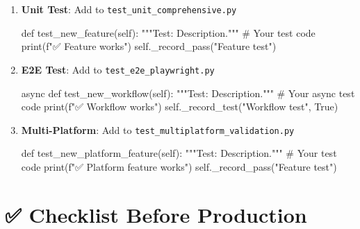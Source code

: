 \documentclass[
  11pt,
  oneside,
  openany]{scrbook}
\newenvironment{Shaded}{\begin{snugshade}}{\end{snugshade}}
\newcommand{\BuiltInTok}[1]{\textcolor[rgb]{0.00,0.23,0.31}{#1}}
\newcommand{\CommentTok}[1]{\textcolor[rgb]{0.37,0.37,0.37}{#1}}
\newcommand{\ControlFlowTok}[1]{\textcolor[rgb]{0.00,0.23,0.31}{#1}}
\newcommand{\KeywordTok}[1]{\textcolor[rgb]{0.00,0.23,0.31}{#1}}
\newcommand{\NormalTok}[1]{\textcolor[rgb]{0.00,0.23,0.31}{#1}}
\newcommand{\SpecialStringTok}[1]{\textcolor[rgb]{0.13,0.47,0.30}{#1}}
\newcommand{\StringTok}[1]{\textcolor[rgb]{0.13,0.47,0.30}{#1}}
\newcommand{\VariableTok}[1]{\textcolor[rgb]{0.07,0.07,0.07}{#1}}
\begin{document}
\begin{enumerate}
\def\labelenumi{\arabic{enumi}.}
\item
  \textbf{Unit Test}: Add to \texttt{test\_unit\_comprehensive.py}

\begin{Shaded}
\begin{Highlighting}[]
\KeywordTok{def}\NormalTok{ test\_new\_feature(}\VariableTok{self}\NormalTok{):}
    \CommentTok{"""Test: Description."""}
    \CommentTok{\# Your test code}
    \BuiltInTok{print}\NormalTok{(}\SpecialStringTok{f"✅ Feature works"}\NormalTok{)}
    \VariableTok{self}\NormalTok{.\_record\_pass(}\StringTok{"Feature test"}\NormalTok{)}
\end{Highlighting}
\end{Shaded}
\item
  \textbf{E2E Test}: Add to \texttt{test\_e2e\_playwright.py}

\begin{Shaded}
\begin{Highlighting}[]
\ControlFlowTok{async} \KeywordTok{def}\NormalTok{ test\_new\_workflow(}\VariableTok{self}\NormalTok{):}
    \CommentTok{"""Test: Description."""}
    \CommentTok{\# Your async test code}
    \BuiltInTok{print}\NormalTok{(}\SpecialStringTok{f"✅ Workflow works"}\NormalTok{)}
    \VariableTok{self}\NormalTok{.\_record\_test(}\StringTok{"Workflow test"}\NormalTok{, }\VariableTok{True}\NormalTok{)}
\end{Highlighting}
\end{Shaded}
\item
  \textbf{Multi-Platform}: Add to
  \texttt{test\_multiplatform\_validation.py}

\begin{Shaded}
\begin{Highlighting}[]
\KeywordTok{def}\NormalTok{ test\_new\_platform\_feature(}\VariableTok{self}\NormalTok{):}
    \CommentTok{"""Test: Description."""}
    \CommentTok{\# Your test code}
    \BuiltInTok{print}\NormalTok{(}\SpecialStringTok{f"✅ Platform feature works"}\NormalTok{)}
    \VariableTok{self}\NormalTok{.\_record\_pass(}\StringTok{"Feature test"}\NormalTok{)}
\end{Highlighting}
\end{Shaded}
\end{enumerate}

\section{✅ Checklist Before
Production}\label{checklist-before-production}
\end{document}
